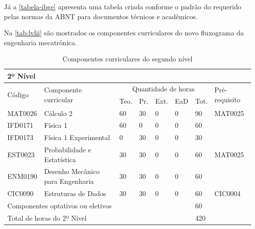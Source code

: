 Já a \autoref{tabela-ibge} apresenta uma tabela criada conforme o padrão do \textcite{ibge1993} requerido pelas normas da ABNT para documentos técnicos e acadêmicos.

\begin{table}[htb]
\end{table}

Na \autoref{tab:lvlii} são mostrados os componentes curriculares do novo fluxograma da engenharia mecatrônica.

\begin{table}[htb]
\small
\begin{center}%
\caption{Componentes curriculares do segundo nível} \label{tab:lvlii}
\noindent%
\begin{tabular}{|m{1.5cm}|m{4.3cm}|m{.7cm}|m{.7cm}|m{.7cm}|m{.7cm}|m{.7cm}|m{2.1cm}|}
\hline%
\multicolumn{8}{|l|}{\textbf{2º Nível}} \\\hline%
\multirow{2}{*}{Código} &
\multirow{2}{*}{Componente curricular} &
\multicolumn{5}{c|}{Quantidade de horas} & 
\multirow{2}{*}{Pré-requisito} \\ 
\cline{3-7} & & Teo. & Pr. & Ext. & EaD & Tot. & \\\hline\hline%
MAT0026 & Cálculo 2 & 60 & 30 & 0 & 0 & 90 & MAT0025 \\\hline%
IFD0171 & Física 1 & 60 & 0 & 0 & 0 & 60 & \\\hline%
IFD0173 & Física 1 Experimental & 0 & 30 & 0 & 0 & 30 & \\\hline%
EST0023 & Probabilidade e Estatística & 30 & 30 & 0 & 0 & 60 & MAT0025 \\\hline%
ENM0190 & Desenho Mecânico para Engenharia & 30 & 30 & 0 & 0 & 60 & \\\hline%
CIC0090 & Estruturas de Dados & 30 & 30 & 0 & 0 & 60 & CIC0004 \\\hline%
\multicolumn{2}{|l|}{Componentes optativos ou eletivos} & & & & & 60 & \multicolumn{1}{r}{} \\\cline{1-7}%
\multicolumn{6}{|l|}{Total de horas do 2º Nível} & 420 & \multicolumn{1}{r}{} \\\cline{1-7}%
\end{tabular}
\end{center}%
\end{table}

